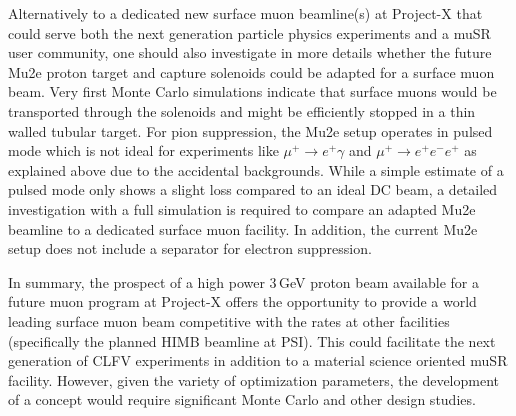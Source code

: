 Alternatively to a dedicated new surface muon beamline(s) at Project-X that could serve both the next generation particle physics experiments and a muSR user community, one should also investigate in more details whether the future Mu2e proton target and capture solenoids could be adapted for a surface muon beam. Very first Monte Carlo simulations indicate that surface muons would be transported through the solenoids and might be efficiently stopped in a thin walled tubular target. For pion suppression, the Mu2e setup operates in pulsed mode which is not ideal for experiments like $\mu^+ \to e^+\gamma$ and $\mu^+ \to e^+e^-e^+$ as explained above due to the accidental backgrounds. While a simple estimate of a pulsed mode only shows a slight loss compared to an ideal DC beam, a detailed investigation with a full simulation is required to compare an adapted Mu2e beamline to a dedicated surface muon facility. In addition, the current Mu2e setup does not include a separator for electron suppression.

In summary, the prospect of a high power 3\,GeV proton beam available for a future muon program at Project-X offers the opportunity to provide a world leading surface muon beam competitive with the rates at other facilities (specifically the planned HIMB beamline at PSI). This could facilitate the next generation of CLFV experiments in addition to a material science oriented muSR facility. However, given the variety of optimization parameters, the development of a concept would require significant Monte Carlo and other design studies.


